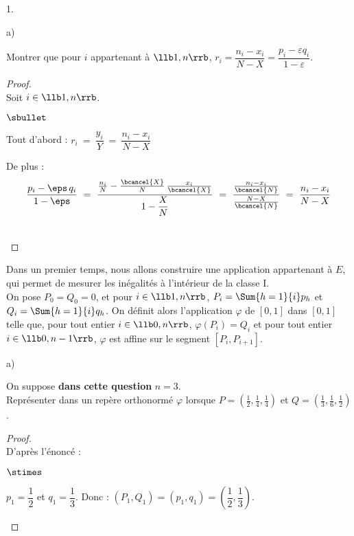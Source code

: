 \begin{noliste}{1.}
\begin{noliste}{a)}
  
  \item Montrer que pour $i$ appartenant à $\llb 1,n \rrb$, $r_i= 
  \dfrac{n_i-x_i}{N-X}= \dfrac{p_i-\varepsilon q_i}{1- \varepsilon}$. 
  
  \begin{proof}~\\
    Soit $i\in \llb 1,n \rrb$.
    \begin{noliste}{$\sbullet$}
      \item Tout d'abord :
      $r_i \ = \ \dfrac{y_i}{Y} \ = \ \dfrac{n_i-x_i}{N-X}$
      
      \item De plus : 
      \[
        \dfrac{p_i-\eps \, q_i}{1-\eps} \ = \ \dfrac{\frac{n_i}{N}
        - \frac{\bcancel{X}}{N} \, \frac{x_i}{\bcancel{X}}}
        {1-\dfrac{X}{N}} \ = \ \dfrac{\frac{n_i-x_i}{\bcancel{N}}}
        {\frac{N-X}{\bcancel{N}}} \ = \ \dfrac{n_i-x_i}{N-X}
      \]
    \end{noliste}
    ~\\[-1cm]
  \end{proof}
 \end{noliste}
 
 
 
 \newpage
 
 
 
 \item Dans un premier temps, nous allons construire une application 
 appartenant à $E$, qui permet de mesurer les inégalités à l'intérieur 
 de la classe I.\\
 On pose $P_0=Q_0=0$, et pour $i \in \llb 1,n \rrb$, $P_i= \Sum{h=1}{i} 
 p_h$ et $Q_i=\Sum{h=1}{i} q_h$. On définit alors l'application 
 $\varphi$ de $[0,1]$ dans $[0,1]$ telle que, pour tout entier $i \in 
 \llb 0,n \rrb$, $\varphi(P_i)=Q_i$ et pour tout entier $i \in \llb 
 0,n-1 \rrb$, $\varphi$ est affine sur le segment $[P_i, P_{i+1}]$. 
 \begin{noliste}{a)}
  \setlength{\itemsep}{2mm}
  \item On suppose \textbf{dans cette question} $n=3$.\\
  Représenter dans un repère orthonormé $\varphi$ lorsque $P= \left( 
  \frac{1}{2}, \frac{1}{4}, \frac{1}{4} \right)$ et $Q=\left( 
  \frac{1}{3}, \frac{1}{6}, \frac{1}{2}  \right)$. 
  
  \begin{proof}~\\
  D'après l'énoncé :
  \begin{noliste}{$\stimes$}
    \item $p_1=\dfrac{1}{2}$ et $q_1 = \dfrac{1}{3}$. Donc : $(P_1,Q_1)
    =(p_1,q_1) = \left(\dfrac{1}{2}, \dfrac{1}{3}\right)$.
    

\end{noliste}
\end{proof}
\end{noliste}
\end{noliste}

